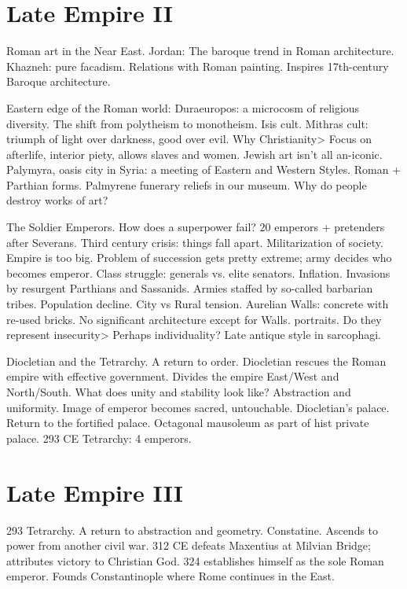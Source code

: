 \documentclass[10pt]{armath}
\begin{document}
\begin{multicols}{2}
\section{Late Empire II}%
\label{sec:late_empire_ii}

Roman art in the Near East. Jordan: The baroque trend in Roman architecture.
Khazneh: pure facadism. Relations with Roman painting. Inspires 17th-century
Baroque architecture.

Eastern edge of the Roman world: Duraeuropos: a microcosm of religious
diversity. The shift from polytheism to monotheism. Isis cult. Mithras cult:
triumph of light over darkness, good over evil. Why Christianity> Focus on
afterlife, interior piety, allows slaves and women. Jewish art isn't all
an-iconic. Palymyra, oasis city in Syria: a meeting of Eastern and Western
Styles. Roman + Parthian forms. Palmyrene funerary reliefs in our museum. Why
do people destroy works of art?

The Soldier Emperors. How does a superpower fail? 20 emperors + pretenders
after Severans. Third century crisis: things fall apart. Militarization of
society. Empire is too big. Problem of succession gets pretty extreme; army
decides who becomes emperor. Class struggle: generals vs. elite senators.
Inflation. Invasions by resurgent Parthians and Sassanids. Armies staffed by
so-called barbarian tribes. Population decline. City vs Rural tension. Aurelian
Walls: concrete with re-used bricks. No significant architecture except for
Walls. portraits. Do they represent insecurity> Perhaps individuality? Late
antique style in sarcophagi.

Diocletian and the Tetrarchy. A return to order. Diocletian rescues the Roman
empire with effective government. Divides the empire East/West and North/South.
What does unity and stability look like? Abstraction and uniformity. Image of
emperor becomes sacred, untouchable. Diocletian's palace. Return to the
fortified palace. Octagonal mausoleum as part of hist private palace. 293 CE
Tetrarchy: 4 emperors.

\section{Late Empire III}%
\label{sec:late_empire_iii}

293 Tetrarchy. A return to abstraction and geometry. Constatine. Ascends to
power from another civil war. 312 CE defeats Maxentius at Milvian Bridge;
attributes victory to Christian God. 324 establishes himself as the sole Roman
emperor. Founds Constantinople where Rome continues in the East.


\end{multicols}
\end{document}
